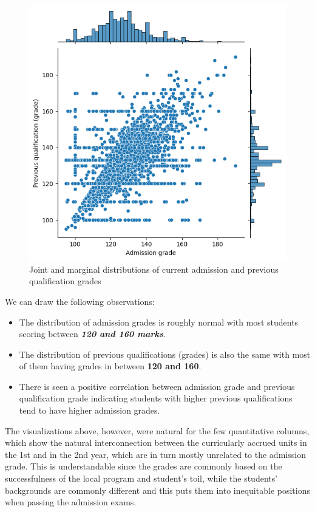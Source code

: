 \documentclass[
  letterpaper,
  DIV=11,
  numbers=noendperiod]{scrartcl}
\begin{document}
\begin{figure}

{\centering \includegraphics{report_AzadhdhinNedalYunisAlFraijat_files/figure-pdf/fig-points-distr-output-1.png}

}

\caption{\label{fig-points-distr}Joint and marginal distributions of
current admission and previous qualification grades}

\end{figure}

We can draw the following observations:

\begin{itemize}
\item
  The distribution of admission grades is roughly normal with most
  students scoring between \textbf{\emph{120 and 160 marks}}.
\item
  The distribution of previous qualifications (grades) is also the same
  with most of them having grades in between \textbf{120 and 160}.
\item
  There is seen a positive correlation between admission grade and
  previous qualification grade indicating students with higher previous
  qualifications tend to have higher admission grades.
\end{itemize}

The visualizations above, however, were natural for the few quantitative
columns, which show the natural interconnection between the curricularly
accrued units in the 1st and in the 2nd year, which are in turn mostly
unrelated to the admission grade. This is understandable since the
grades are commonly based on the successfulness of the local program and
student's toil, while the students' backgrounds are commonly different
and this puts them into inequitable positions when passing the admission
exams.
\end{document}

